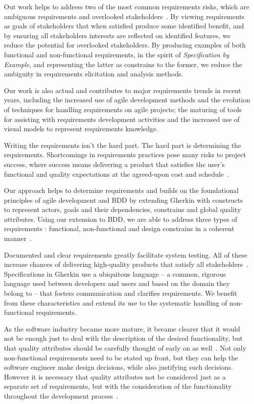 \documentclass[dissertation,final]{softeng}
\newcommand{\nfrs}{non-functional requirements\xspace}
\begin{document}
Out work helps to address two of the most common requirements risks, which are ambiguous requirements and overlooked stakeholders~\citep[p. 20]{Wiegers2013}. By viewing requirements as goals of stakeholders that when satisfied produce some identified benefit, and by ensuring all stakeholders interests are reflected on identified features, we reduce the potential for overlooked stakeholders. By producing examples of both functional and \nfrs, in the spirit of \emph{Specification by Example}, and representing the latter as constrains to the former, we reduce the ambiguity in requirements elicitation and analysis methods.

Our work is also actual and contributes to major requirements trends in recent years, including the increased use of agile development methods and the evolution of techniques for handling requirements on agile projects; the maturing of tools for assisting with requirements development activities and the increased use of visual models to represent requirements knowledge.

Writing the requirements isn't the hard part. The hard part is determining the requirements. Shortcomings in requirements practices pose many risks to project success, where success means delivering a product that satisfies the user's functional and quality expectations at the agreed-upon cost and schedule~\citep{Wiegers2013}.

Our approach helps to determine requirements and builds on the foundational principles of agile development and BDD by extending Gherkin with constructs to represent actors, goals and their dependencies, constrains and global quality attributes. Using our extension to BDD, we are able to address three types of requirements : functional, non-functional and design constrains in a coherent manner~\citep{Leffingwell2011}.

Documented and clear requirements greatly facilitate system testing. All of these increase chances of delivering high-quality products that satisfy all stakeholders~\citep{Wiegers2013}. Specifications in Gherkin use a ubiquitous language -- a common, rigorous language used between developers and users and based on the domain they belong to -- that fosters communication and clarifies requirements. We benefit from these characteristics and extend its use to the systematic handling of \nfrs.

As the software industry became more mature, it became clearer that it would not be enough just to deal with the description of the desired functionality, but that quality attributes should be carefully thought of early on as well~\citep{Chung:2009vg}. Not only non-functional requirements need to be stated up front, but they can help the software engineer make design decisions, while also justifying such decisions. However it is necessary that quality attributes not be considered just as a separate set of requirements, but with the consideration of the functionality throughout the development process~\citep{Chung:2009vg}.
\end{document}
